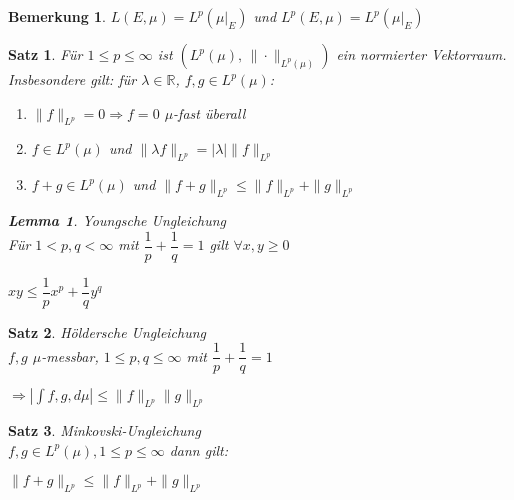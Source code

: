 \documentclass[11pt]{memoir}
\theoremstyle{changebreak}
\newtheorem{Bemerkung}{Bemerkung}[chapter]
\newtheorem{Lemma}{Lemma}[chapter]
\newtheorem{Satz}{Satz}[chapter]
\begin{document}
\begin{Bemerkung}
$L(E, \mu) = L^p(\mu|_E)$ und $L^p(E, \mu) = L^p(\mu|_E)$
\end{Bemerkung}

\begin{Satz}
Für $1 \leq p \leq \infty$ ist $(L^p(\mu),\, \|\cdotp\|_{L^p(\mu)})$ ein normierter Vektorraum. Insbesondere gilt: für $\lambda \in \mathbb R$, $f, g \in L^p(\mu)$:
\begin{enumerate}
	\item $\|f\|_{L^p} = 0 \Rightarrow f=0$ $\mu$-fast überall
	\item $f \in L^p(\mu)$ und $\|\lambda f\|_{L^p} = |\lambda|\|f\|_{L^p}$
	\item $f +g \in L^p(\mu)$ und $\|f + g\|_{L^p} \leq \|f\|_{L^p} + \|g\|_{L^p}$
\end{enumerate}

\begin{Lemma}
\emph{Youngsche Ungleichung} \\
Für $1 < p, q < \infty$ mit $\dfrac{1}{p}+\dfrac{1}{q} =1$ gilt $\forall x, y \geq 0$
\begin{center}
	$xy \leq \dfrac{1}{p}x^p + \dfrac{1}{q}y^q$
\end{center}
\end{Lemma}
\end{Satz}

\begin{Satz}
\emph{Höldersche Ungleichung} \\
$f, g$ $\mu$-messbar, $1 \leq p, q \leq \infty$ mit $\dfrac{1}{p}+\dfrac{1}{q} =1$ \\
\begin{center}
	$\Rightarrow \left| \int f, g, d\mu\right| \leq \|f\|_{L^p}\|g\|_{L^p}$
\end{center}
\end{Satz}


\begin{Satz}
\emph{Minkovski-Ungleichung} \\
$f, g \in L^p(\mu), 1 \leq p \leq \infty$ dann gilt:
\begin{center}
	$\|f+g\|_{L^p} \leq \|f\|_{L^p} + \|g\|_{L^p}$
\end{center}
\end{Satz}
\end{document}
